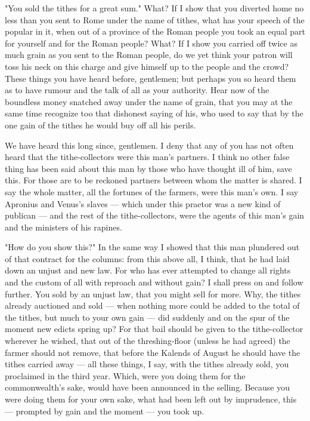  "You sold the tithes for a great sum." What? If I show that you diverted home no less than you sent to Rome under the name of tithes, what has your speech of the popular in it, when out of a province of the Roman people you took an equal part for yourself and for the Roman people? What? If I show you carried off twice as much grain as you sent to the Roman people, do we yet think your patron will toss his neck on this charge and give himself up to the people and the crowd? These things you have heard before, gentlemen; but perhaps you so heard them as to have rumour and the talk of all as your authority. Hear now of the boundless money snatched away under the name of grain, that you may at the same time recognize too that dishonest saying of his, who used to say that by the one gain of the tithes he would buy off all his perils.

 We have heard this long since, gentlemen. I deny that any of you has not often heard that the tithe-collectors were this man's partners. I think no other false thing has been said about this man by those who have thought ill of him, save this. For those are to be reckoned partners between whom the matter is shared. I say the whole matter, all the fortunes of the farmers, were this man's own. I say Apronius and Venus's slaves --- which under this praetor was a new kind of publican --- and the rest of the tithe-collectors, were the agents of this man's gain and the ministers of his rapines.

 "How do you show this?" In the same way I showed that this man plundered out of that contract for the columns: from this above all, I think, that he had laid down an unjust and new law. For who has ever attempted to change all rights and the custom of all with reproach and without gain? I shall press on and follow further. You sold by an unjust law, that you might sell for more. Why, the tithes already auctioned and sold --- when nothing more could be added to the total of the tithes, but much to your own gain --- did suddenly and on the spur of the moment new edicts spring up? For that bail should be given to the tithe-collector wherever he wished, that out of the threshing-floor (unless he had agreed) the farmer should not remove, that before the Kalends of August he should have the tithes carried away --- all these things, I say, with the tithes already sold, you proclaimed in the third year. Which, were you doing them for the commonwealth's sake, would have been announced in the selling. Because you were doing them for your own sake, what had been left out by imprudence, this --- prompted by gain and the moment --- you took up.

